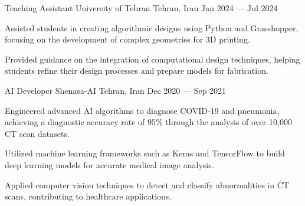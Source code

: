 \begin{cventries}
	\cventry
	{Teaching Assistant} %
	{University of Tehran} %
	{Tehran, Iran} %
	{\textcolor{neutraltext}{Jan 2024 --- Jul 2024}} %
	{
		\begin{cvitems} %
			\item Assisted students in creating algorithmic designs using Python and Grasshopper, focusing on the development of complex geometries for 3D printing.
			\item Provided guidance on the integration of computational design techniques, helping students refine their design processes and prepare models for fabrication.
		\end{cvitems}
	}
	
	\cventry
	{AI Developer} %
	{Shenasa-AI} %
	{Tehran, Iran} %
	{\textcolor{neutraltext}{Dec 2020 --- Sep 2021}} %
	{
		\begin{cvitems} %
			\item Engineered advanced AI algorithms to diagnose COVID-19 and pneumonia, achieving a diagnostic accuracy rate of 95\% through the analysis of over 10,000 CT scan datasets.
			\item Utilized machine learning frameworks such as Keras and TensorFlow to build deep learning models for accurate medical image analysis.
			\item Applied computer vision techniques to detect and classify abnormalities in CT scans, contributing to healthcare applications.
		\end{cvitems}
	}
	
\end{cventries}
